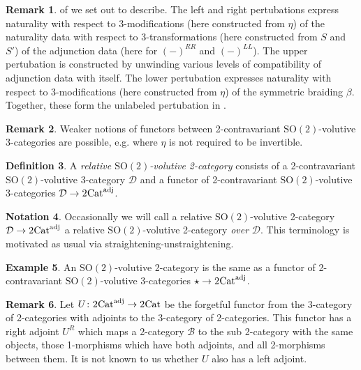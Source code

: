 \documentclass{article}
\newcommand{\Cat}{\operatorname{Cat}}%
\newcommand{\Sotwo}{\operatorname{SO(2)}}
\newcommand{\B}{\mathcal{B}}
\newcommand{\D}{\mathcal{D}}
\numberwithin{equation}{section}
\theoremstyle{definition}
\newtheorem{definition}{Definition}[subsection]
\newtheorem{example}[definition]{Example}
\newtheorem{remark}[definition]{Remark}
\newtheorem{notation}[definition]{Notation}
\theoremstyle{theorem}
\begin{document}
\begin{remark}
    of  we set out to describe. The left and right pertubations express 
    naturality with respect to 3-modifications (here constructed from $\eta$) of 
    the naturality data with respect to 3-transformations (here constructed from $S$ and $S'$) of the adjunction data (here for $(-)^{RR}$ and $(-)^{LL}$). 
    The upper pertubation is constructed by unwinding various levels of compatibility of adjunction data with itself. The lower pertubation expresses 
    naturality with respect to 3-modifications (here constructed from $\eta$) of the symmetric braiding $\beta$. Together, these form the unlabeled 
    pertubation in . 
\end{remark}
\begin{remark}
    Weaker notions of functors between 2-contravariant $\Sotwo$-volutive 3-categories are possible, e.g. where $\eta$ is not required to be invertible.
\end{remark}
\begin{definition}
    A \emph{relative $\Sotwo$-volutive 2-category} consists of a 2-contravariant $\Sotwo$-volutive 3-category $\D$ and a 
    functor of 2-contravariant $\Sotwo$-volutive 3-categories $\D \to 2\hspace{-0.05cm}\Cat^{\operatorname{adj}}$.
\end{definition}
\begin{notation}
    Occasionally we will call a relative $\Sotwo$-volutive 2-category $\D \to 2\hspace{-0.05cm}\Cat^{\operatorname{adj}}$ a 
    relative $\Sotwo$-volutive 2-category \emph{over} $\D$. This terminology is motivated as usual via straightening-unstraightening.
\end{notation}
\begin{example}
    An $\Sotwo$-volutive 2-category is the same as a functor of 2-contravariant $\Sotwo$-volutive 3-categories $\star \to 2\hspace{-0.05cm}\Cat^{\operatorname{adj}}$. 
\end{example}
\begin{remark}
    Let $U \colon 2\hspace{-0.05cm}\Cat^{\operatorname{adj}} \to 2\hspace{-0.05cm}\Cat$ be the forgetful functor from the 3-category of 2-categories with adjoints 
    to the 3-category of 2-categories. This functor has a right adjoint $U^R$ which maps a 2-category $\B$ to the sub 2-category 
    with the same objects, those 1-morphisms which have both adjoints, and all 2-morphisms between them. It is not known to us whether $U$ also has a left adjoint.
\end{remark}
\end{document}
